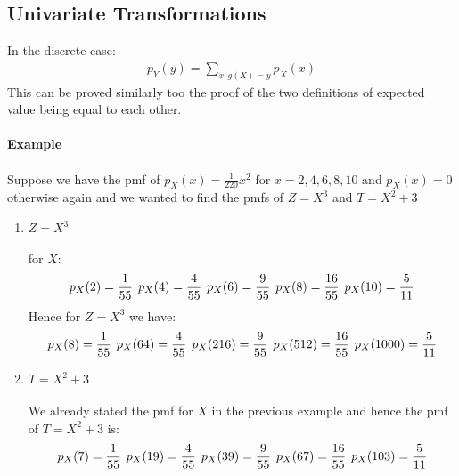 \documentclass[,oneside]{article}
\begin{document}
\begin{enumerate}
\subsection{Univariate Transformations}
In the discrete case:
\begin{align*}
p_Y(y)= \sum_{x: g(X)=y} p_X(x)
\end{align*}
This can be proved similarly too the proof of the two definitions of expected value being equal to each other.\\ \\
\textbf{Example}\\ \\
Suppose we have the pmf of $p_X(x)=\frac{1}{220}x^2$ for $x =2,4,6,8,10$ and $p_X(x)=0$ otherwise again and we wanted to find the pmfs of $Z = X^3$ and $T = X^2 + 3$\\
\begin{enumerate}
\item  $Z = X^3$ \\ \\
for $X$:
\begin{align*}
p_X(2)=\frac{1}{55} \hspace{0.15cm }p_X(4)=\frac{4}{55} \hspace{0.15cm} p_X(6)=\frac{9}{55}\hspace{0.15cm} p_X(8)=\frac{16}{55} \hspace{0.15cm} p_X(10)=\frac{5}{11}
\end{align*}
Hence for $Z = X^3$ we have:
\begin{align*}
p_X(8)=\frac{1}{55} \hspace{0.15cm }p_X(64)=\frac{4}{55} \hspace{0.15cm} p_X(216)=\frac{9}{55}\hspace{0.15cm} p_X(512)=\frac{16}{55} \hspace{0.15cm} p_X(1000)=\frac{5}{11}
\end{align*}
\item $T = X^2 + 3$\\ \\
We already stated the pmf for $X$ in the previous example and hence the pmf of $T=X^2+3$ is:
\begin{align*}
p_X(7)=\frac{1}{55} \hspace{0.15cm }p_X(19)=\frac{4}{55} \hspace{0.15cm} p_X(39)=\frac{9}{55}\hspace{0.15cm} p_X(67)=\frac{16}{55} \hspace{0.15cm} p_X(103)=\frac{5}{11}

\end{align*}
\end{enumerate}
\end{enumerate}
\end{document}
